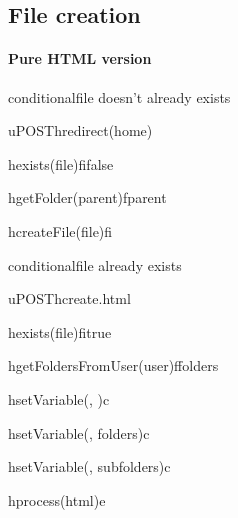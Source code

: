 \documentclass[a4paper, dvipsnames]{article}
\begin{document}
	\pagebreak
	
	\subsection{File creation}
	
	\paragraph{Pure HTML version}
	
	\begin{center}
		\begin{sequencediagram}
			
			\begin{sdblock}{conditional}{file doesn't already exists}
				\begin{call}{u}{POST}{h}{redirect(home)}
					\begin{call}{h}{exists(file)}{fi}{false}
					\end{call}
					\begin{call}{h}{getFolder(parent)}{f}{parent}
					\end{call}
					\begin{call}{h}{createFile(file)}{fi}{}
					\end{call}
				\end{call}
			\end{sdblock}
			\begin{sdblock}{conditional}{file already exists}
				\begin{call}{u}{POST}{h}{create.html}
					\begin{call}{h}{exists(file)}{fi}{true}
					\end{call}
					\begin{call}{h}{getFoldersFromUser(user)}{f}{folders}
					\end{call}
					\begin{call}{h}{setVariable(, )}{c}{}
					\end{call}
					\begin{call}{h}{setVariable(, folders)}{c}{}
					\end{call}
					\begin{call}{h}{setVariable(, subfolders)}{c}{}
					\end{call}
					\begin{call}{h}{process(html)}{e}{}
					\end{call}
				\end{call}
			\end{sdblock}
		\end{sequencediagram}
	\end{center}
	
\end{document}
